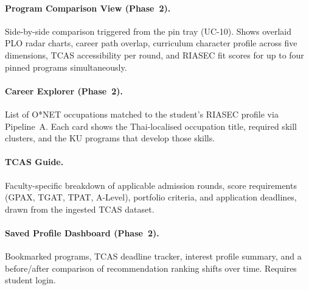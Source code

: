 \paragraph{Program Comparison View (Phase~2).}
Side-by-side comparison triggered from the pin tray (UC-10). Shows overlaid PLO radar charts, career path overlap, curriculum character profile across five dimensions, TCAS accessibility per round, and RIASEC fit scores for up to four pinned programs simultaneously.

\paragraph{Career Explorer (Phase~2).}
List of O*NET occupations matched to the student's RIASEC profile via Pipeline~A. Each card shows the Thai-localised occupation title, required skill clusters, and the KU programs that develop those skills.

\paragraph{TCAS Guide.}
Faculty-specific breakdown of applicable admission rounds, score requirements (GPAX, TGAT, TPAT, A-Level), portfolio criteria, and application deadlines, drawn from the ingested TCAS dataset.

\paragraph{Saved Profile Dashboard (Phase~2).}
Bookmarked programs, TCAS deadline tracker, interest profile summary, and a before/after comparison of recommendation ranking shifts over time. Requires student login.
